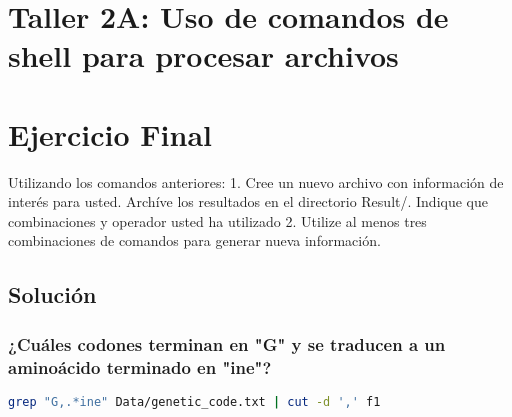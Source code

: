 \documentclass[10pt]{article}
\begin{document}
\section{Taller 2A: Uso de comandos de shell para procesar archivos}

\section{Ejercicio Final}

Utilizando los comandos anteriores:
1. Cree un nuevo archivo con información de interés para usted. Archíve los resultados  en el directorio Result/. Indique que combinaciones y operador usted ha utilizado
2. Utilize al menos tres combinaciones de comandos para generar nueva información.

\subsection*{Solución}

\subsubsection*{¿Cuáles codones terminan en "G" y se traducen a un aminoácido terminado en "ine"?}

\begin{lstlisting}[language=sh]
    grep "G,.*ine" Data/genetic_code.txt | cut -d ',' f1
\end{lstlisting}
\end{document}
